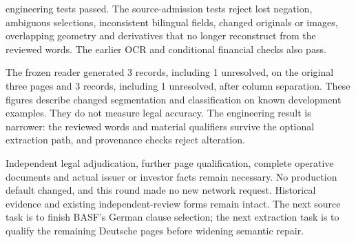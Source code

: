 \documentclass[11pt]{article}
\begin{document}
 engineering tests passed. The source-admission tests reject lost negation,
ambiguous selections, inconsistent bilingual fields, changed originals or images,
overlapping geometry and derivatives that no longer reconstruct from the reviewed
words. The earlier OCR and conditional financial checks also pass.

The frozen reader generated 3 records, including 1 unresolved,
on the original three pages and 3 records, including 1 unresolved,
after column separation. These figures describe changed segmentation and
classification on known development examples. They do not measure legal accuracy.
The engineering result is narrower: the reviewed words and material qualifiers
survive the optional extraction path, and provenance checks reject alteration.

Independent legal adjudication, further page qualification, complete operative
documents and actual issuer or investor facts remain necessary. No production
default changed, and this round made no new network request. Historical evidence
and existing independent-review forms remain intact. The next source task is to
finish BASF's German clause selection; the next extraction task is to qualify
the remaining Deutsche pages before widening semantic repair.
\end{document}
